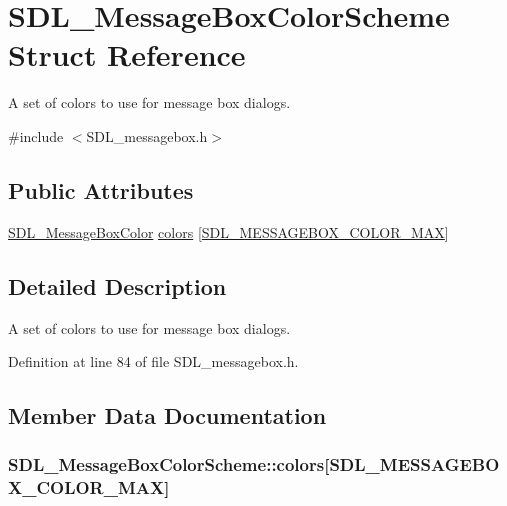\hypertarget{struct_s_d_l___message_box_color_scheme}{\section{S\-D\-L\-\_\-\-Message\-Box\-Color\-Scheme Struct Reference}
\label{struct_s_d_l___message_box_color_scheme}
}


A set of colors to use for message box dialogs.  




{\ttfamily \#include $<$S\-D\-L\-\_\-messagebox.\-h$>$}

\subsection*{Public Attributes}
\begin{DoxyCompactItemize}
\item 
\hyperlink{struct_s_d_l___message_box_color}{S\-D\-L\-\_\-\-Message\-Box\-Color} \hyperlink{struct_s_d_l___message_box_color_scheme_ae3712ec81e41b63b781b7d49d3b3b8f6}{colors} \mbox{[}\hyperlink{_s_d_l__messagebox_8h_a75e562d38bc214725e01f4f829bc1567a0a575b056603e38e844b141c83a44d89}{S\-D\-L\-\_\-\-M\-E\-S\-S\-A\-G\-E\-B\-O\-X\-\_\-\-C\-O\-L\-O\-R\-\_\-\-M\-A\-X}\mbox{]}
\end{DoxyCompactItemize}


\subsection{Detailed Description}
A set of colors to use for message box dialogs. 

Definition at line 84 of file S\-D\-L\-\_\-messagebox.\-h.



\subsection{Member Data Documentation}
\hypertarget{struct_s_d_l___message_box_color_scheme_ae3712ec81e41b63b781b7d49d3b3b8f6}{
\subsubsection[{colors}]{ S\-D\-L\-\_\-\-Message\-Box\-Color\-Scheme\-::colors\mbox{[}{\bf S\-D\-L\-\_\-\-M\-E\-S\-S\-A\-G\-E\-B\-O\-X\-\_\-\-C\-O\-L\-O\-R\-\_\-\-M\-A\-X}\mbox{]}}}\label{struct_s_d_l___message_box_color_scheme_ae3712ec81e41b63b781b7d49d3b3b8f6}


